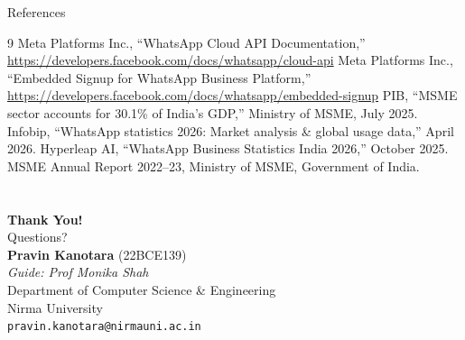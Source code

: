 \documentclass[aspectratio=169]{beamer}
\begin{document}
\begin{frame}{References}
\small
\begin{thebibliography}{9}
 Meta Platforms Inc., ``WhatsApp Cloud API Documentation,'' \url{https://developers.facebook.com/docs/whatsapp/cloud-api}
 Meta Platforms Inc., ``Embedded Signup for WhatsApp Business Platform,'' \url{https://developers.facebook.com/docs/whatsapp/embedded-signup}
 PIB, ``MSME sector accounts for 30.1\% of India's GDP,'' Ministry of MSME, July 2025.
 Infobip, ``WhatsApp statistics 2026: Market analysis \& global usage data,'' April 2026.
 Hyperleap AI, ``WhatsApp Business Statistics India 2026,'' October 2025.
 MSME Annual Report 2022--23, Ministry of MSME, Government of India.
\end{thebibliography}
\end{frame}

\section{}
\begin{frame}[plain]
\begin{center}
\vspace{1.5cm}
{\Huge\textbf{Thank You!}} \\
\vspace{0.5cm}
{\Large Questions?}\\
\vspace{0.8cm}
\normalsize
\textbf{Pravin Kanotara} (22BCE139)\\
\textit{Guide: Prof Monika Shah}\\
Department of Computer Science \& Engineering\\
Nirma University\\
\vspace{0.5cm}
\small
\texttt{pravin.kanotara@nirmauni.ac.in}
\end{center}
\end{frame}
\end{document}
